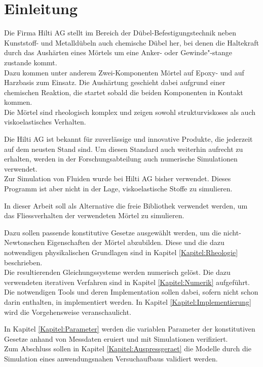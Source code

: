 \section{Einleitung}
\label{Kapitel:Einleitung}
Die Firma Hilti AG stellt im Bereich der Dübel-Befestigungstechnik neben Kunststoff- und Metalldübeln auch chemische Dübel her, bei denen die Haltekraft durch das Aushärten eines Mörtels um eine Anker- oder Gewinde"-stange zustande kommt. \\
Dazu kommen unter anderem Zwei-Komponenten Mörtel auf Epoxy- und auf Harzbasis zum Einsatz. Die Aushärtung geschieht dabei aufgrund einer chemischen Reaktion, die startet sobald die beiden Komponenten in Kontakt kommen.\\
Die Mörtel sind rheologisch komplex und zeigen sowohl strukturviskoses als auch viskoelastisches Verhalten.%

Die Hilti AG ist bekannt für zuverlässige und innovative Produkte, die jederzeit auf dem neusten Stand sind. Um diesen Standard auch weiterhin aufrecht zu erhalten, werden in der Forschungsabteilung auch numerische Simulationen verwendet.\\
Zur Simulation von Fluiden wurde bei Hilti AG bisher \cfx{} verwendet. Dieses Programm ist aber nicht in der Lage, viskoelastische Stoffe zu simulieren.%

In dieser Arbeit soll als Alternative die freie Bibliothek \openfoam{} verwendet werden, um das Fliessverhalten der verwendeten Mörtel zu simulieren.

Dazu sollen passende konstitutive Gesetze ausgewählt werden, um die nicht-Newtonschen Eigenschaften der Mörtel abzubilden. Diese und die dazu notwendigen physikalischen Grundlagen sind in Kapitel \ref{Kapitel:Rheologie} beschrieben.\\
Die resultierenden Gleichungssysteme werden numerisch gelöst. Die dazu verwendeten iterativen Verfahren sind in Kapitel \ref{Kapitel:Numerik} aufgeführt.
Die notwendigen Tools und deren Implementation sollen dabei, sofern nicht schon darin enthalten, in \openfoam{} implementiert werden. In Kapitel \ref{Kapitel:Implementierung} wird die Vorgehensweise veranschaulicht.

In Kapitel \ref{Kapitel:Parameter} werden die variablen Parameter der konstitutiven Gesetze anhand von Messdaten eruiert und mit Simulationen verifiziert.\\

Zum Abschluss sollen in Kapitel \ref{Kapitel:Auspressgeraet} die Modelle durch die Simulation eines anwendungsnahen Versuchaufbaus validiert werden.
